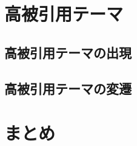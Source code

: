 \documentclass[12pt,a4paper,twocolumn,twoside]{ujsikpb}
\begin{document}
\section{高被引用テーマ}

\subsection{高被引用テーマの出現}



\subsection{高被引用テーマの変遷}








\section{まとめ}




\end{document}
